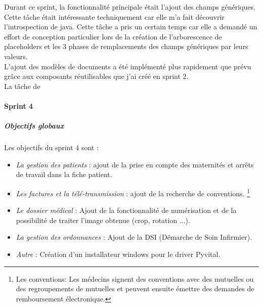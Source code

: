 Durant ce sprint, la fonctionnalité principale était l'ajout des champs génériques. Cette tâche était intéressante techniquement car elle m'a fait découvrir l'introspection de java. Cette tâche a pris un certain temps car elle a demandé un effort de conception particulier lors de la création de l'arborescence de placeholders et les 3 phases de remplacements des champs génériques par leurs valeurs.  \\
L'ajout des modèles de documents a été implémenté plus rapidement que prévu grâce aux composants réutilisables que j'ai créé en sprint 2.\\
La tâche de 

\newpage
\paragraph*{Sprint 4}
\subparagraph{Objectifs globaux}

Les objectifs du sprint 4 sont : 
\begin{itemize}
\item \textit{La gestion des patients} : ajout  de la prise en compte des maternités et arrêts de travail dans la fiche patient.

\item \textit{Les factures et la télé-transmission} : ajout de la recherche de conventions. \footnote{Les conventions: Les médecins signent des conventions avec des mutuelles ou des regroupements de mutuelles et peuvent ensuite émettre des demandes de remboursement électronique.} 

\item \textit{Le dossier médical} : Ajout de la fonctionnalité de numérisation et de la possibilité de traiter l'image obtenue (crop, rotation ...).

\item \textit{La gestion des ordonnances} : Ajout de la DSI (Démarche de Soin Infirmier).

\item \textit{Autre} : Création d'un installateur windows pour le driver Pyvital. 
\end{itemize} 

